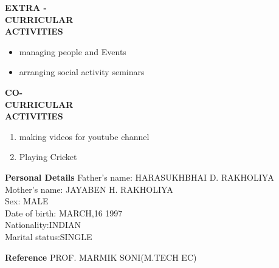 \documentclass{article}
\begin{document}
 	\begin{flushleft} 
 		
 		
 		
 		\vspace{0.4in}
 		\textbf{EXTRA - \\CURRICULAR \\ACTIVITIES }
 		\begin{itemize}
 			\vspace{-0.65in}
 			\addtolength{\itemindent}{1.359in}
 			\item  managing people and Events
 			\item  arranging social activity seminars
 			
 		\end{itemize}
 	\end{flushleft}

 \begin{flushleft} 
 	\vspace{0.4in}
 	\textbf{CO- \\CURRICULAR \\ACTIVITIES }
 	\begin{enumerate}
 		\vspace{-0.65in}
 		\addtolength{\itemindent}{1.359in}
 		\item  making videos for youtube channel 
 		\item  Playing Cricket
 		
 	\end{enumerate}
 \end{flushleft}


\begin{flushleft}
	\vspace{0.4in}
	\textbf{Personal Details} \hspace{0.36in}Father's name: \hspace{0.13in} HARASUKHBHAI D. RAKHOLIYA \\
	\hspace{1.55in}Mother's name: \hspace{0.08in} JAYABEN H. RAKHOLIYA\\
	\hspace{1.55in}Sex:\hspace{0.85in} MALE\\
	\hspace{1.55in}Date of birth:\hspace{0.255in} MARCH,16 1997	\\
	\hspace{1.55in}Nationality:\hspace{0.45in}INDIAN\\
	\hspace{1.55in}Marital status:\hspace{0.28in}SINGLE
	
\end{flushleft}

\begin{flushleft}
	\vspace{0.4in}
	\textbf{Reference} \hspace{0.75in} PROF. MARMIK SONI(M.TECH EC)
\end{flushleft}
\end{document}
